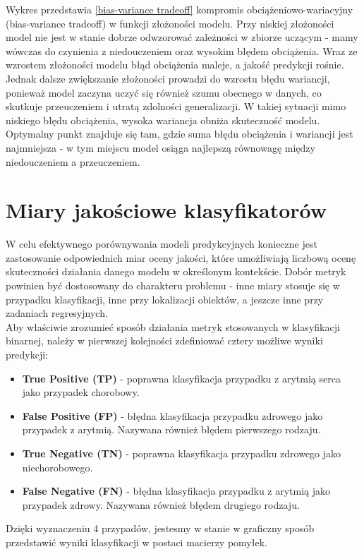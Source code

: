 \documentclass[a4paper,twoside,12pt]{book}
\begin{document}
Wykres przedstawia \ref{bias-variance tradeoff} kompromis obciążeniowo-wariacyjny (bias-variance tradeoff) w funkcji złożoności modelu. Przy niskiej złożoności model nie jest w stanie dobrze odwzorować zależności w zbiorze uczącym - mamy wówczas do czynienia z niedouczeniem oraz wysokim błędem obciążenia. Wraz ze wzrostem złożoności modelu błąd obciążenia maleje, a jakość predykcji rośnie. Jednak dalsze zwiększanie złożoności prowadzi do wzrostu błędu wariancji, ponieważ model zaczyna uczyć się również szumu obecnego w danych, co skutkuje przeuczeniem i utratą zdolności generalizacji. W takiej sytuacji mimo niskiego błędu obciążenia, wysoka wariancja obniża skuteczność modelu. Optymalny punkt znajduje się tam, gdzie suma błędu obciążenia i wariancji jest najmniejsza - w tym miejscu model osiąga najlepszą równowagę między niedouczeniem a przeuczeniem.


\section{Miary jakościowe klasyfikatorów}
W celu efektywnego porównywania modeli predykcyjnych konieczne jest zastosowanie odpowiednich miar oceny jakości, które umożliwiają liczbową ocenę skuteczności działania danego modelu w określonym kontekście. Dobór metryk powinien być dostosowany do charakteru problemu - inne miary stosuje się w przypadku klasyfikacji, inne przy lokalizacji obiektów, a jeszcze inne przy zadaniach regresyjnych.\\

Aby właściwie zrozumieć sposób działania metryk stosowanych w klasyfikacji binarnej, należy w pierwszej kolejności zdefiniować cztery możliwe wyniki predykcji:
\begin{itemize}
	\item \textbf{True Positive (TP)} - poprawna klasyfikacja przypadku z arytmią serca jako przypadek chorobowy.
	\item \textbf{False Positive (FP)} - błędna klasyfikacja przypadku zdrowego jako przypadek z arytmią. Nazywana również błędem pierwszego rodzaju.
	\item \textbf{True Negative (TN)} - poprawna klasyfikacja przypadku zdrowego jako niechorobowego.
	\item \textbf{False Negative (FN)} - błędna klasyfikacja przypadku z arytmią jako przypadek zdrowy. Nazywana również błędem drugiego rodzaju.
\end{itemize}
Dzięki wyznaczeniu 4 przypadów, jestesmy w stanie w graficzny sposób przedstawić wyniki klasyfikacji w postaci macierzy pomyłek.
\end{document}

